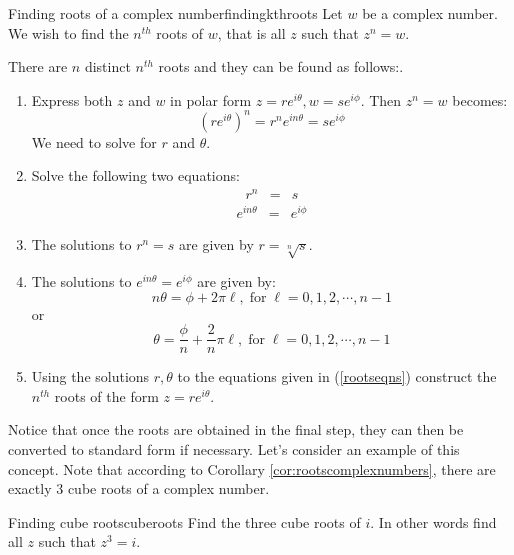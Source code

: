 \begin{procedure}{Finding roots of a complex number}{findingkthroots}
Let $w$ be a complex number. We wish to find the $n^{th}$ roots of $w$, that is all $z$ such that $z^n = w$. 

There are $n$ distinct $n^{th}$ roots and they can be found as follows:. 
 
\begin{enumerate}
\item Express both $z$ and $w$ in polar form $z=re^{i\theta}, w=se^{i\phi}$. Then $z^n = w$ becomes:
\[
(re^{i\theta})^n = r^n e^{i n \theta} = se^{i\phi}
\]
We need to solve for $r$ and $\theta$. 
\item Solve the following two equations:
\begin{eqnarray*}
r^n &=& s 
\end{eqnarray*}
\begin{eqnarray}
e^{i n \theta} &=& e^{i \phi}
\label{rootseqns}
\end{eqnarray}
\item The solutions to $r^n = s$ are given by $r = \sqrt[n]{s}$. 

\item The solutions to $e^{i n \theta} = e^{i \phi}$ are given by:
\[
n\theta = \phi + 2\pi \ell,  \; \mbox{for} \; \ell = 0,1,2, \cdots, n-1
\]
or
\[
\theta = \frac{\phi}{n} + \frac{2}{n} \pi \ell, \; \mbox{for} \; \ell = 0,1,2, \cdots, n-1 
\]
\item
Using the solutions $r, \theta$ to the equations given in (\ref{rootseqns})
construct the $n^{th}$ roots of the form $z = re^{i\theta}$.  
\end{enumerate}
\end{procedure}

Notice that once the roots are obtained in the final step, they can then be converted to standard form if necessary. Let's consider an example of this concept. Note that according to Corollary \ref{cor:rootscomplexnumbers}, 
there are exactly $3$ cube roots of a complex number.

\begin{example}{Finding cube roots}{cuberoots}
Find the three cube roots of $i.$ In other words find all $z$ such that $z^3 = i$. 
\end{example}

